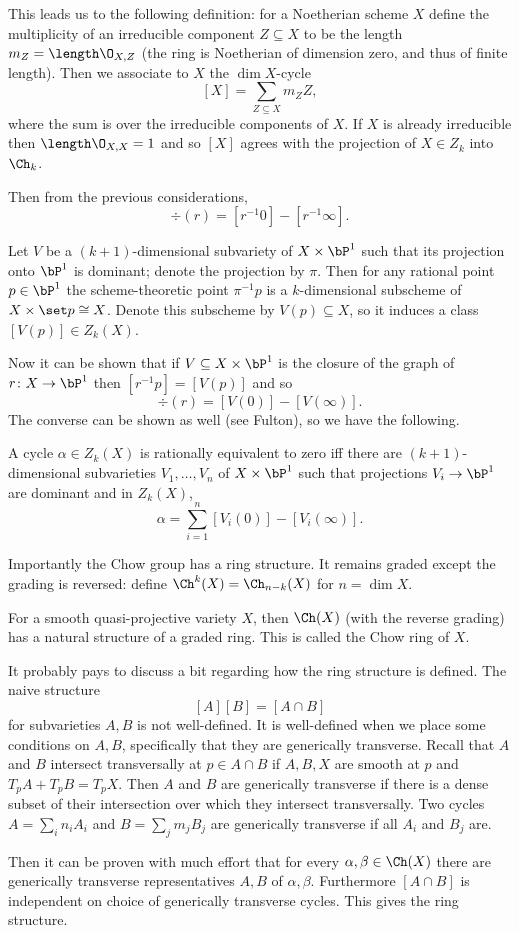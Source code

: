 This leads us to the following definition: for a Noetherian scheme $X$ define the {\emphcolor multiplicity} of an irreducible
component $Z\subseteq X$ to be the length $m_Z=\length\O_{X,Z}$ (the ring is Noetherian of dimension zero, and thus of finite length).
Then we associate to $X$ the $\dim X$-cycle
$$ [X] = \sum_{Z\subseteq X}m_ZZ , $$
where the sum is over the irreducible components of $X$.
If $X$ is already irreducible then $\length\O_{X,X}=1$ and so $[X]$ agrees with the projection of $X\in Z_k$ into $\Ch_k$.

Then from the previous considerations,
$$ \div(r) = [r^{-1}0] - [r^{-1}\infty] . $$

\bdefn

    Let $V$ be a $(k+1)$-dimensional subvariety of $X\times\bP^1$ such that its projection onto $\bP^1$
    is dominant; denote the projection by $\pi$.
    Then for any rational point $p\in\bP^1$ the scheme-theoretic point $\pi^{-1}p$ is a $k$-dimensional
    subscheme of $X\times\set p\cong X$.
    Denote this subscheme by $V(p)\subseteq X$, so it induces a class $[V(p)]\in Z_k(X)$.

\edefn

Now it can be shown that if $V\subseteq X\times\bP^1$ is the closure of the graph of $r\colon X\to\bP^1$
then $[r^{-1}p]=[V(p)]$ and so
$$ \div(r) = [V(0)] - [V(\infty)] . $$
The converse can be shown as well (see Fulton), so we have the following.

\bprop

    A cycle $\alpha\in Z_k(X)$ is rationally equivalent to zero iff there are $(k+1)$-dimensional
    subvarieties $V_1,\dots,V_n$ of $X\times\bP^1$ such that projections $V_i\to\bP^1$ are dominant
    and in $Z_k(X)$,
    $$ \alpha = \sum_{i=1}^n[V_i(0)]-[V_i(\infty)] . $$

\eprop



Importantly the Chow group has a ring structure.
It remains graded except the grading is reversed: define $\Ch^k(X)=\Ch_{n-k}(X)$ for $n=\dim X$.

\bthrm

    For a smooth quasi-projective variety $X$, then $\Ch(X)$ (with the reverse grading) has a natural
    structure of a graded ring.
    This is called the {\emphcolor Chow ring} of $X$.

\ethrm

\bremark

    It probably pays to discuss a bit regarding how the ring structure is defined.
    The naive structure
    $$ [A][B] = [A\cap B] $$
    for subvarieties $A,B$ is not well-defined.
    It is well-defined when we place some conditions on $A,B$, specifically that they are
    {\emphcolor generically transverse}.
    Recall that $A$ and $B$ intersect transversally at $p\in A\cap B$ if $A,B,X$ are smooth at $p$ and
    $T_pA+T_pB=T_pX$.
    Then $A$ and $B$ are generically transverse if there is a dense subset of their intersection over which
    they intersect transversally.
    Two cycles $A=\sum_in_iA_i$ and $B=\sum_jm_jB_j$ are generically transverse if all $A_i$ and $B_j$ are.

    Then it can be proven with much effort that for every $\alpha,\beta\in\Ch(X)$ there are generically
    transverse representatives $A,B$ of $\alpha,\beta$.
    Furthermore $[A\cap B]$ is independent on choice of generically transverse cycles.
    This gives the ring structure.

\eremark

